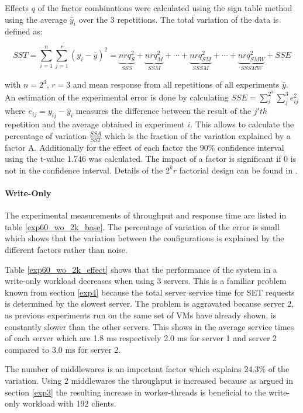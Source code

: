 \documentclass[report.tex]{subfiles}
\begin{document}
Effects $q$ of the factor combinations were calculated using the sign table method using the average $\hat{y}_i$ over the 3 repetitions.
The total variation of the data is defined as: 

\begin{equation}
 	SST = \sum_{i=1}^n\sum_{j=1}^r (y_i - \bar{y})^2 = \underbrace{nrq_S^2}_{SSS} + \underbrace{nrq_M^2}_{SSM} + \cdots +  \underbrace{nrq_{SM}^2}_{SSSM} + \cdots + \underbrace{nrq_{SMW}^2}_{SSSMW} + SSE
\end{equation}

with $n=2^3$, $r=3$ and mean response from all repetitions of all experiments $\bar{y}$. 
An estimation of the experimental error is done by  calculating  $SSE = \sum_{i}^{2^3}\sum_{j}^{3} e_{ij}^2$ where $e_{ij} = y_{ij} - \hat{y}_{i}$ measures the difference between the result of the $j'th$ repetition and the average obtained in experiment $i$.
This allows to calculate the percentage of variation $\frac{SSA}{SST}$ which is the fraction of the variation explained by a factor A.
Additionally for the effect of each factor the 90\% confidence interval using the t-value 1.746 was calculated.
The impact of a factor is significant if 0 is not in the confidence interval.
Details of the $2^{k}r$ factorial design can be found in \cite{books/daglib/0076234}.

\paragraph{Write-Only}

The experimental measurements of throughput and response time are listed in table \ref{exp60_wo_2k_base}.
The percentage of variation of the error is small which shows that the variation between the configurations is explained by the different factors rather than noise.

Table \ref{exp60_wo_2k_effect} shows that the performance of the system in a write-only workload decreases when using 3 servers.  This is a familiar problem known from section \ref{exp4} because the total server service time for SET requests is determined by the slowest server. The problem is aggravated because server 2, as previous experiments run on the same set of VMs have already shown, is constantly slower than the other servers. This shows in the average service times of each server which are 1.8 ms respectively 2.0 ms for server 1 and server 2 compared to 3.0 ms for server 2.

The number of middlewares is an important factor which explains 24.3\% of the variation. Using 2 middlewares the throughput is increased because as argued in section \ref{exp3} the resulting increase in worker-threads is beneficial to the write-only workload with 192 clients.
\end{document}
